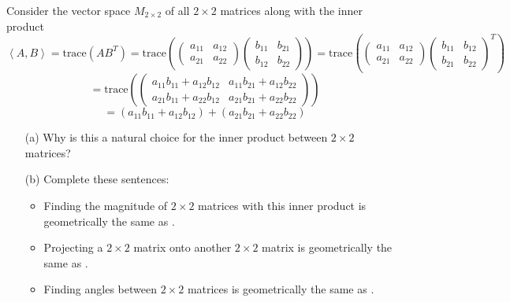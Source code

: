 \begin{problem}
    Consider the vector space $M_{2\times2}$ of all $2 \times 2$ matrices along with the
    inner product 
    \[ \left<A,B\right> = \text{trace}(AB^T) = \text{trace}\left( 
        \begin{pmatrix} a_{11} & a_{12} \\ 
                        a_{21} & a_{22} \end{pmatrix} 
        \begin{pmatrix} b_{11} & b_{21} \\
        b_{12} & b_{22} \end{pmatrix} \right) = \text{trace}\left( 
        \begin{pmatrix} a_{11} & a_{12} \\ 
                        a_{21} & a_{22} \end{pmatrix} 
        \begin{pmatrix} b_{11} & b_{12} \\
        b_{21} & b_{22} \end{pmatrix}^T \right)\]
    \[ = \text{trace}\left(
                    \begin{pmatrix} a_{11}b_{11} + a_{12} b_{12} & a_{11}b_{21} +
                        a_{12}b_{22} \\ a_{21}b_{11} + a_{22}b_{12} & a_{21} b_{21} +
                    a_{22} b_{22} \end{pmatrix} \right) \]
    \[ = \left( a_{11}b_{11} + a_{12} b_{12} \right) + \left(  a_{21} b_{21} + a_{22}
    b_{22}\right) \]
    \begin{enumerate}
        \item[(a)] Why is this a natural choice for the inner product between $2 \times 2$ matrices?
        \item[(b)] Complete these sentences: 
            \begin{itemize}
                \item Finding the magnitude of $2 \times 2$ matrices with this inner
                    product is geometrically the
                    same as \underline{\hspace{1in}}.
                \item Projecting a $2 \times 2$ matrix onto another $2 \times 2$ matrix is
                    geometrically the same as \underline{\hspace{1in}}.
                \item Finding angles between $2 \times 2$ matrices is geometrically the
                    same as \underline{\hspace{1in}}.
            \end{itemize}
    \end{enumerate}
\end{problem}


